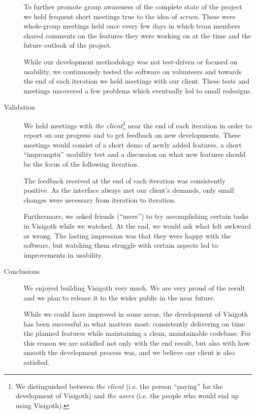\documentclass[a4paper,11pt]{article}
\begin{document}
\begin{description}
  To further promote group awareness of the complete state of the
  project we held frequent short meetings true to the idea of
  \emph{scrum}. These were whole-group meetings held once every few
  days in which team members shared comments on the features they
  were working on at the time and the future outlook of the project.

  While our development methodology was not test-driven or focused on
  usability, we continuously tested the software on volunteers and
  towards the end of each iteration we held meetings with our client.
  These tests and meetings uncovered a few problems which eventually
  led to small redesigns.

\item[Validation]

  We held meetings with \emph{the client}\footnote{We distinguished
    between \emph{the client} (i.e.  the person ``paying'' for the
    development of Visigoth) and \emph{the users} (i.e. the people who
    would end up using Visigoth).} near the end of each iteration in
  order to report on our progress and to get feedback on new
  developments. These meetings would consist of a short demo of newly
  added features, a short ``impromptu'' usability test and a
  discussion on what new features should be the focus of the following
  iteration.

  The feedback received at the end of each iteration was consistently
  positive. As the interface always met our client's demands, only
  small changes were necessary from iteration to iteration.

  Furthermore, we asked friends (``users'') to try accomplishing
  certain tasks in Visigoth while we watched. At the end, we would ask
  what felt awkward or wrong. The lasting impression was that they
  were happy with the software, but watching them struggle with
  certain aspects led to improvements in usability.

\item[Conclusions]

  We enjoyed building Visigoth very much. We are very proud of the
  result and we plan to release it to the wider public in the near
  future.

  While we could have improved in some areas, the development of
  Visigoth has been successful in what matters most: consistently
  delivering on time the planned features while maintaining a clean,
  maintainable codebase. For this reason we are satisfied not only
  with the end result, but also with how smooth the development
  process was, and we believe our client is also satisfied.

\end{description}
\end{document}
